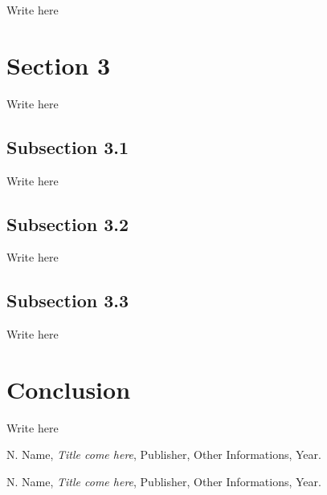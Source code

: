 \documentclass[10pt,twocolumn,letterpaper]{article}
\begin{document}
Write here





\section[do not write in this area]{Section 3}

Write here


\subsection{Subsection 3.1}

Write here



\subsection{Subsection 3.2}

Write here


\subsection{Subsection 3.3}

Write here





\section[do not write in this area]{Conclusion}

Write here





{\small


\begin{thebibliography}{9}

  N. Name,
  \textit{Title come here},
  Publisher,
  Other Informations,
  Year.


  N. Name,
  \textit{Title come here},
  Publisher,
  Other Informations,
  Year.
  

\end{thebibliography}
}
\end{document}

